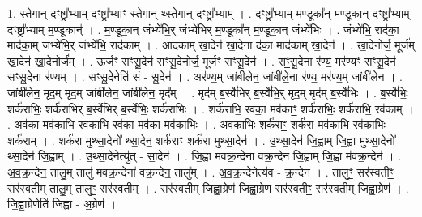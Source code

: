 \documentclass[17pt]{extarticle}
\begin{document}
1. स्ते॒गान् दꣳष्ट्रा᳚भ्या॒म् दꣳष्ट्रा᳚भ्याꣳ स्ते॒गान् थ्स्ते॒गान् दꣳष्ट्रा᳚भ्याम् । . दꣳष्ट्रा᳚भ्याम् म॒ण्डूका᳚न् म॒ण्डूका॒न् दꣳष्ट्रा᳚भ्या॒म् दꣳष्ट्रा᳚भ्याम् म॒ण्डूकान्॑ । . म॒ण्डूका॒न् जंभ्ये॑भि॒र् जंभ्ये॑भिर् म॒ण्डूका᳚न् म॒ण्डूका॒न् जंभ्ये॑भिः । . जंभ्ये॑भि॒ राद॑का॒ माद॑का॒म् जंभ्ये॑भि॒र् जंभ्ये॑भि॒ राद॑काम् । . आद॑काम् खा॒देन॑ खा॒देना द॑का॒ माद॑काम् खा॒देन॑ । . खा॒देनोर्ज॒ मूर्ज॑म् खा॒देन॑ खा॒देनोर्ज᳚म् । . ऊर्जꣳ॑ सꣳसू॒देन॑ सꣳसू॒देनोर्ज॒ मूर्जꣳ॑ सꣳसू॒देन॑ । . सꣳ॒॒सू॒देना र॑ण्य॒ मर॑ण्यꣳ सꣳसू॒देन॑ सꣳसू॒देना र॑ण्यम् । . सꣳ॒॒सू॒देनेति॑ सं - सू॒देन॑ । . अर॑ण्य॒म् जांबी॑लेन॒ जांबी॑ले॒ना र॑ण्य॒ मर॑ण्य॒म् जांबी॑लेन । . जांबी॑लेन॒ मृद॒म् मृद॒म् जांबी॑लेन॒ जांबी॑लेन॒ मृद᳚म् । . मृद॑म् ब॒र्स्वे॑भिर् ब॒र्स्वे॑भि॒र् मृद॒म् मृद॑म् ब॒र्स्वे॑भिः । . ब॒र्स्वे॑भिः॒ शर्क॑राभिः॒ शर्क॑राभिर् ब॒र्स्वे॑भिर् ब॒र्स्वे॑भिः॒ शर्क॑राभिः । . शर्क॑राभि॒ रव॑का॒ मव॑काꣳ॒॒ शर्क॑राभिः॒ शर्क॑राभि॒ रव॑काम् । . अव॑का॒ मव॑काभि॒ रव॑काभि॒ रव॑का॒ मव॑का॒ मव॑काभिः । . अव॑काभिः॒ शर्क॑राꣳ॒॒ शर्क॑रा॒ मव॑काभि॒ रव॑काभिः॒ शर्क॑राम् । . शर्क॑रा मुथ्सा॒देनो᳚ थ्सा॒देन॒ शर्क॑राꣳ॒॒ शर्क॑रा मुथ्सा॒देन॑ । . उ॒थ्सा॒देन॑ जि॒ह्वाम् जि॒ह्वा मु॑थ्सा॒देनो᳚ थ्सा॒देन॑ जि॒ह्वाम् । . उ॒थ्सा॒देनेत्यु॑त् - सा॒देन॑ । . जि॒ह्वा म॑वक्र॒न्देना॑ वक्र॒न्देन॑ जि॒ह्वाम् जि॒ह्वा म॑वक्र॒न्देन॑ । . अ॒व॒क्र॒न्देन॒ तालु॒म् तालु॑ मवक्र॒न्देना॑ वक्र॒न्देन॒ तालु᳚म् । . अ॒व॒क्र॒न्देनेत्य॑व - क्र॒न्देन॑ । . तालुꣳ॒॒ सर॑स्वतीꣳ॒॒ सर॑स्वती॒म् तालु॒म् तालुꣳ॒॒ सर॑स्वतीम् । . सर॑स्वतीम् जिह्वा॒ग्रेण॑ जिह्वा॒ग्रेण॒ सर॑स्वतीꣳ॒॒ सर॑स्वतीम् जिह्वा॒ग्रेण॑ । . जि॒ह्वा॒ग्रेणेति॑ जिह्वा - अ॒ग्रेण॑ । \newline
\end{document}
